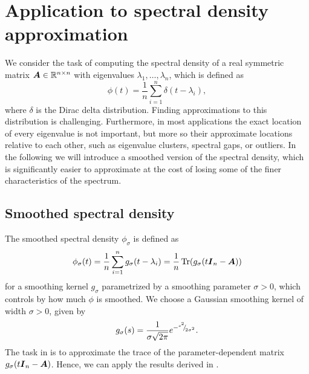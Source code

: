 \documentclass[12pt]{article}
\begin{document}
\section{Application to spectral density approximation}
\label{sec:application}

We consider the task of computing the spectral density of a real symmetric matrix $\boldsymbol{A} \in \mathbb{R}^{n \times n}$ with eigenvalues $\lambda_1, \dots, \lambda_n$, which is defined as
\begin{equation}
    \phi(t) = \frac{1}{n} \sum_{i=1}^{n} \delta(t - \lambda_i),
    \label{equ:spectral-density}
\end{equation}
where $\delta$ is the Dirac delta distribution. Finding approximations to this distribution is challenging. Furthermore, in most applications the exact location of every eigenvalue is not important, but more so their approximate locations relative to each other, such as eigenvalue clusters, spectral gaps, or outliers. In the following we will introduce a smoothed version of the spectral density, which is significantly easier to approximate at the cost of losing some of the finer characteristics of the spectrum.

\subsection{Smoothed spectral density}
\label{subsec:spectral-density}

The smoothed spectral density $\phi_{\sigma}$ is defined as
\begin{equation}
    \phi_{\sigma}(t) = \frac{1}{n} \sum_{i=1}^{n} g_{\sigma}(t - \lambda_i) = \frac{1}{n} \operatorname{Tr}(g_{\sigma}(t\boldsymbol{I}_n - \boldsymbol{A}))
    \label{equ:smooth-spectral-density}
\end{equation}
for a smoothing kernel $g_{\sigma}$ parametrized by a smoothing parameter $\sigma > 0$, which controls by how much $\phi$ is smoothed. We choose a Gaussian smoothing kernel of width $\sigma > 0$, given by
\begin{equation}
    g_{\sigma}(s) = \frac{1}{\sigma \sqrt{2\pi}} e^{-{}^{s^2}{\mskip -5mu/\mskip -3mu}_{2\sigma^2}}.
    \label{equ:smoothing-kernel}
\end{equation}
The task in  is to approximate the trace of the parameter-dependent matrix $g_{\sigma}(t\boldsymbol{I}_n - \boldsymbol{A})$. Hence, we can apply the results derived in .
\end{document}

